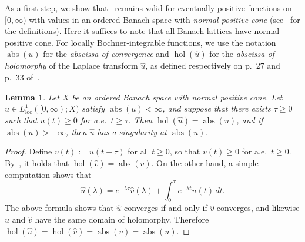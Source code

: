 \documentclass[a4paper, reqno]{amsart}
\numberwithin{equation}{section}
\theoremstyle{plain}
\newtheorem{lemma}[theorem]{Lemma}
\theoremstyle{definition}
\theoremstyle{remark}
\DeclareMathOperator{\abs}{abs}
\DeclareMathOperator{\hol}{hol}
\begin{document}
As a first step, we show that~\cite[Theorem 1.5.3]{ABHN} remains valid for eventually positive functions on $[0,\infty)$ with values in an ordered Banach space with \emph{normal positive cone} (see~\cite[Appendix C]{ABHN} for the definitions). Here it suffices to note that all Banach lattices have normal positive cone. For locally Bochner-integrable functions, we use the notation $\abs(u)$ for the \emph{abscissa of convergence} and $\hol(\hat{u})$ for the \emph{abscissa of holomorphy} of the Laplace transform $\hat{u}$, as defined respectively on p.~27 and p.~33 of~\cite{ABHN}.
\begin{lemma}
	\label{lem:hol=abs}
	Let $X$ be an ordered Banach space with normal positive cone. Let $u\in L^1_{\mathrm{loc}}([0,\infty);X)$ satisfy $\abs(u)<\infty$, and suppose that there exists $\tau\ge 0$ such that $u(t)\ge 0$ for a.e.\ $t\ge\tau$. Then $\hol(\hat{u})=\abs(u)$, and if $\abs(u)>-\infty$, then $\hat{u}$ has a singularity at $\abs(u)$.
\end{lemma}
\begin{proof}
	Define $v(t):=u(t+\tau)$ for all $t\ge 0$, so that $v(t)\ge 0$ for a.e.\ $t\ge 0$. By~\cite[Theorem 1.5.3]{ABHN}, it holds that $\hol(\hat{v})=\abs(v)$. On the other hand, a simple computation shows that
	\begin{equation}
		\hat{u}(\lambda) = e^{-\lambda\tau} \hat{v}(\lambda) + \int_0^\tau e^{-\lambda t}u(t)\,dt.
	\end{equation}
	The above formula shows that $\hat{u}$ converges if and only if $\hat{v}$ converges, and likewise $\hat{u}$ and $\hat{v}$ have the same domain of holomorphy. Therefore $\hol(\hat{u})=\hol(\hat{v})=\abs(v)=\abs(u)$.
\end{proof}
\end{document}
